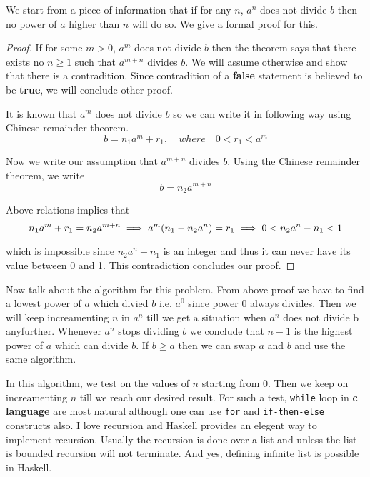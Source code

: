 \documentclass{report}%
\begin{document}
We start from a piece of information that if for any $n$, $a^n$ does not
divide $b$ then no power of $a$ higher than $n$ will do so. We give a
formal proof for this.

\begin{proof} 
If for some $m > 0$, $a^m$ does not divide $b$ then the theorem says
that there exists no $n \geq 1$ such that $a^{m+n}$ divides $b$. We
will assume otherwise and show that there is a contradition. Since
contradition of a \textbf{false} statement is believed to be
\textbf{true}, we will conclude other proof.

It is known that $a^m$ does not divide $b$ so we can write it in
following way using Chinese remainder theorem.
\begin{equation*}
b = n_1 a^m + r_1, \quad where \quad 0 < r_1 < a^m 
\end{equation*}

Now we write our assumption that $a^{m+n}$ divides $b$. Using the
Chinese remainder theorem, we write
\begin{equation*}
b = n_2 a^{m+n} 
\end{equation*}

Above relations implies that
\begin{equation*}
n_1 a^m + r_1 = n_2 a^{m+n} \\
\implies a^m (n_1 - n_2 a^n ) = r_1 \\
\implies 0 < n_2 a^n - n_1 < 1
\end{equation*}

which is impossible since $n_2 a^n - n_1$ is an integer and thus it can
never have its value between 0 and 1. This contradiction concludes our
proof.
\end{proof}

Now talk about the algorithm for this problem. From above proof we
have to find a lowest power of $a$ which divied $b$ i.e. $a^0$ since
power 0 always divides. Then we will keep increamenting $n$ in $a^n$
till we get a situation when $a^n$ does not divide b anyfurther.
Whenever $a^n$ stops dividing $b$ we conclude that $n-1$ is the
highest power of $a$ which can divide $b$. If $b \geq a$ then we can
swap $a$ and $b$ and use the same algorithm.

In this algorithm, we test on the values of $n$ starting from $0$.
Then we keep on increamenting $n$ till we reach our desired result.
For such a test, \texttt{while} loop in \textbf{c language} are most
natural although one can use \texttt{for} and \texttt{if-then-else}
constructs also. I love recursion and Haskell provides an elegent way
to implement recursion. Usually the recursion is done over a list and
unless the list is bounded recursion will not terminate. And yes,
defining infinite list is possible in Haskell.
\end{document}
